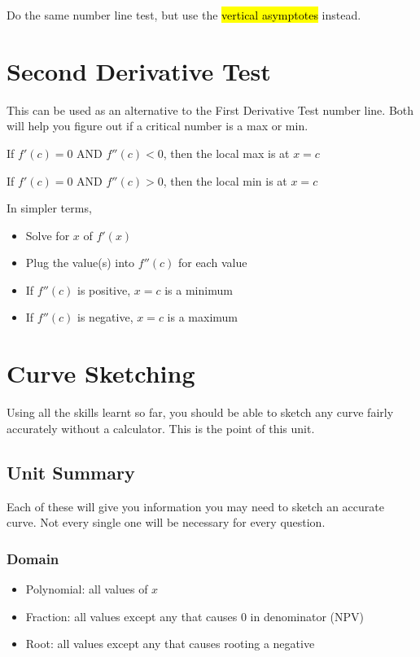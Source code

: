 \documentclass[a4paper,12pt]{article}
\begin{document}
Do the same number line test, but use the \hl{vertical asymptotes} instead.

\pagebreak

\section{Second Derivative Test}
This can be used as an alternative to the First Derivative Test number line. Both will help you figure out if a critical number is a max or min.

\begin{center}
If $f'(c) = 0$ AND $f''(c) < 0$, then the local max is at $x = c$

If $f'(c) = 0$ AND $f''(c) > 0$, then the local min is at $x = c$
\end{center}

In simpler terms,
\begin{itemize}
    \item{Solve for $x$ of $f'(x)$}
    \item{Plug the value(s) into $f''(c)$ for each value}
    \item{If $f''(c)$ is positive, $x = c$ is a minimum}
    \item{If $f''(c)$ is negative, $x = c$ is a maximum}
\end{itemize}

\pagebreak

\section{Curve Sketching}
Using all the skills learnt so far, you should be able to sketch any curve fairly accurately without a calculator. This is the point of this unit.

\subsection{Unit Summary}
Each of these will give you information you may need to sketch an accurate curve. Not every single one will be necessary for every question.

\subsubsection{Domain}
\begin{itemize}
    \item{Polynomial: all values of $x$}
    \item{Fraction: all values except any that causes 0 in denominator (NPV)}
    \item{Root: all values except any that causes rooting a negative}
\end{itemize}
\end{document}
